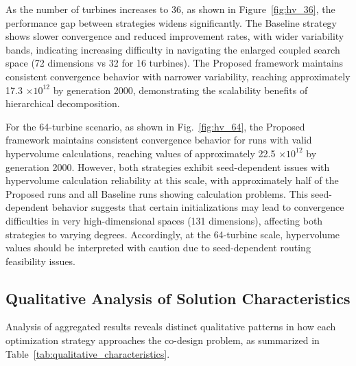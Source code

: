 \documentclass[format=sigconf,anonymous=true,review=true]{acmart}
\begin{document}
As the number of turbines increases to 36, as shown in Figure~\ref{fig:hv_36}, the performance gap between strategies widens significantly. The Baseline strategy shows slower convergence and reduced improvement rates, with wider variability bands, indicating increasing difficulty in navigating the enlarged coupled search space (72 dimensions vs 32 for 16 turbines). The Proposed framework maintains consistent convergence behavior with narrower variability, reaching approximately 17.3 $\times 10^{12}$ by generation 2000, demonstrating the scalability benefits of hierarchical decomposition.

For the 64-turbine scenario, as shown in Fig.~\ref{fig:hv_64}, the Proposed framework maintains consistent convergence behavior for runs with valid hypervolume calculations, reaching values of approximately 22.5 $\times 10^{12}$ by generation 2000. However, both strategies exhibit seed-dependent issues with hypervolume calculation reliability at this scale, with approximately half of the Proposed runs and all Baseline runs showing calculation problems. This seed-dependent behavior suggests that certain initializations may lead to convergence difficulties in very high-dimensional spaces (131 dimensions), affecting both strategies to varying degrees. Accordingly, at the 64-turbine scale, hypervolume values should be interpreted with caution due to seed-dependent routing feasibility issues.


\subsection{Qualitative Analysis of Solution Characteristics}
Analysis of aggregated results reveals distinct qualitative patterns in how each optimization strategy approaches the co-design problem, as summarized in Table~\ref{tab:qualitative_characteristics}.
\end{document}
